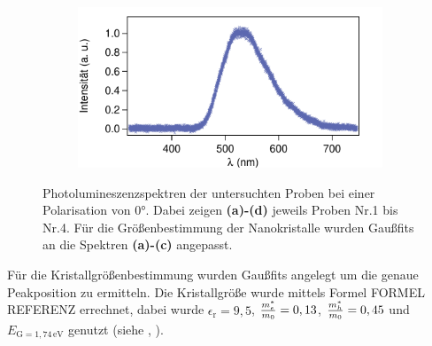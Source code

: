 \begin{figure}[H]
\begin{subfigure}{0.49\textwidth}
        \caption{}
        \label{fig:A3}
    \end{subfigure}
    \begin{subfigure}{0.49\textwidth}
        \includegraphics[width=\textwidth]{bilder/Nr4_Pol0.pdf}
        \caption{}
        \label{fig:A4}
    \end{subfigure}
    \caption{Photolumineszenzspektren der untersuchten Proben bei einer Polarisation von 0°. Dabei zeigen \textbf{(a)-(d)} jeweils Proben Nr.1 bis Nr.4. Für die Größenbestimmung der Nanokristalle wurden Gaußfits an die Spektren \textbf{(a)-(c)} angepasst.}
    \label{fig:Pol0}
\end{figure}
Für die Kristallgrößenbestimmung wurden Gaußfits angelegt um die genaue Peakposition zu ermitteln.
Die Kristallgröße wurde mittels Formel FORMEL REFERENZ errechnet, dabei wurde $\epsilon_{\text{r}}=9,5$, $\frac{m_e^*}{m_{\text0}}=0,13$, $\frac{m_h^*}{m_{\text0}}=0,45$ und $E_{\text{G}=1,74\,\si{\electronvolt}}$ genutzt (siehe \cite{anleitung}, \cite{Manipulation}).

\begin{table}[H]
    \centering
    \caption{Mittels Gaußfit bestimmte Peakpositionen und errechnete Kristallgrößen für die Nanokristalle.}
    \label{tab:Kristallgroesse}
\end{table}

